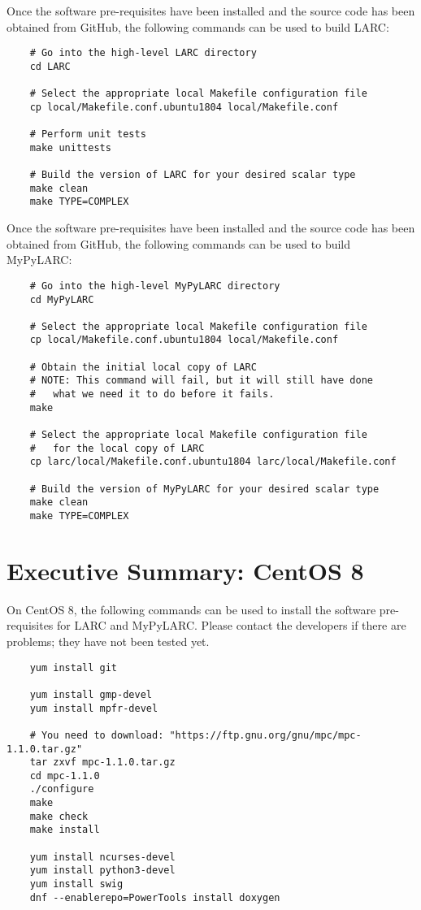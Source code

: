 \documentclass{article}
\begin{document}
\noindent
Once the software pre-requisites have been installed
and the source code has been obtained from GitHub, the
following commands can be used to build LARC:
\begin{verbatim}
    # Go into the high-level LARC directory
    cd LARC

    # Select the appropriate local Makefile configuration file
    cp local/Makefile.conf.ubuntu1804 local/Makefile.conf

    # Perform unit tests
    make unittests

    # Build the version of LARC for your desired scalar type
    make clean
    make TYPE=COMPLEX
\end{verbatim}

\noindent
Once the software pre-requisites have been installed
and the source code has been obtained from GitHub, the
following commands can be used to build MyPyLARC:
\begin{verbatim}
    # Go into the high-level MyPyLARC directory
    cd MyPyLARC

    # Select the appropriate local Makefile configuration file
    cp local/Makefile.conf.ubuntu1804 local/Makefile.conf

    # Obtain the initial local copy of LARC
    # NOTE: This command will fail, but it will still have done
    #   what we need it to do before it fails.
    make

    # Select the appropriate local Makefile configuration file
    #   for the local copy of LARC
    cp larc/local/Makefile.conf.ubuntu1804 larc/local/Makefile.conf

    # Build the version of MyPyLARC for your desired scalar type
    make clean
    make TYPE=COMPLEX
\end{verbatim}


\section{Executive Summary: CentOS 8}
On CentOS 8, the following commands can be used to install the
software pre-requisites for LARC and MyPyLARC.
Please contact the developers if there are problems; they have
not been tested yet.
\begin{verbatim}
    yum install git             

    yum install gmp-devel
    yum install mpfr-devel

    # You need to download: "https://ftp.gnu.org/gnu/mpc/mpc-1.1.0.tar.gz"
    tar zxvf mpc-1.1.0.tar.gz
    cd mpc-1.1.0
    ./configure
    make
    make check
    make install

    yum install ncurses-devel
    yum install python3-devel
    yum install swig
    dnf --enablerepo=PowerTools install doxygen
\end{verbatim}
\end{document}
